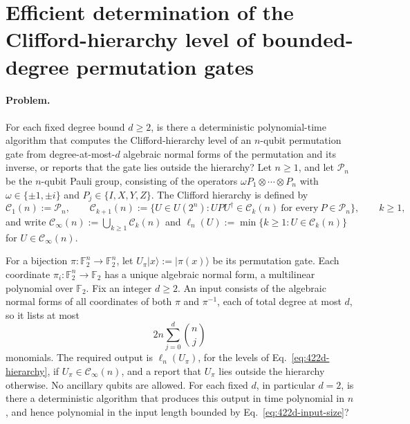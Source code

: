 \section{Efficient determination of the Clifford-hierarchy level of bounded-degree permutation gates}
\label{sec:op_422d240a5f2cb7da}

\paragraph{Problem.}
For each fixed degree bound $d\geq2$, is there a deterministic
polynomial-time algorithm that computes the Clifford-hierarchy level of an
$n$-qubit permutation gate from degree-at-most-$d$ algebraic normal forms of
the permutation and its inverse, or reports that the gate lies outside the
hierarchy?  Let $n\geq1$, and let $\mathcal P_n$ be the $n$-qubit Pauli group,
consisting of the operators $\omega P_1\otimes\cdots\otimes P_n$ with
$\omega\in\{\pm1,\pm i\}$ and $P_j\in\{I,X,Y,Z\}$.  The Clifford hierarchy is
defined by
\begin{equation}
  \mathcal C_1(n):=\mathcal P_n,
  \qquad
  \mathcal C_{k+1}(n):=\bigl\{U\in U(2^n):UPU^\dagger\in\mathcal C_k(n)
    \ \text{for every}\ P\in\mathcal P_n\bigr\},
  \qquad k\geq1,
  \label{eq:422d-hierarchy}
\end{equation}
and write $\mathcal C_\infty(n):=\bigcup_{k\geq1}\mathcal C_k(n)$ and
$\ell_n(U):=\min\{k\geq1:U\in\mathcal C_k(n)\}$ for
$U\in\mathcal C_\infty(n)$.

For a bijection $\pi:\mathbb F_2^n\to\mathbb F_2^n$, let
$U_\pi|x\rangle:=|\pi(x)\rangle$ be its permutation gate.  Each coordinate
$\pi_i:\mathbb F_2^n\to\mathbb F_2$ has a unique algebraic normal form, a
multilinear polynomial over $\mathbb F_2$.  Fix an integer $d\geq2$.  An input
consists of the algebraic normal forms of all coordinates of both $\pi$ and
$\pi^{-1}$, each of total degree at most $d$, so it lists at most
\begin{equation}
  2n\sum_{j=0}^{d}\binom{n}{j}
  \label{eq:422d-input-size}
\end{equation}
monomials.  The required output is $\ell_n(U_\pi)$, for the levels of
Eq.~\eqref{eq:422d-hierarchy}, if $U_\pi\in\mathcal C_\infty(n)$, and a report
that $U_\pi$ lies outside the hierarchy otherwise.  No ancillary qubits are
allowed.  For each fixed $d$, in particular $d=2$, is there a deterministic
algorithm that produces this output in time polynomial in $n$, and hence
polynomial in the input length bounded by Eq.~\eqref{eq:422d-input-size}?

